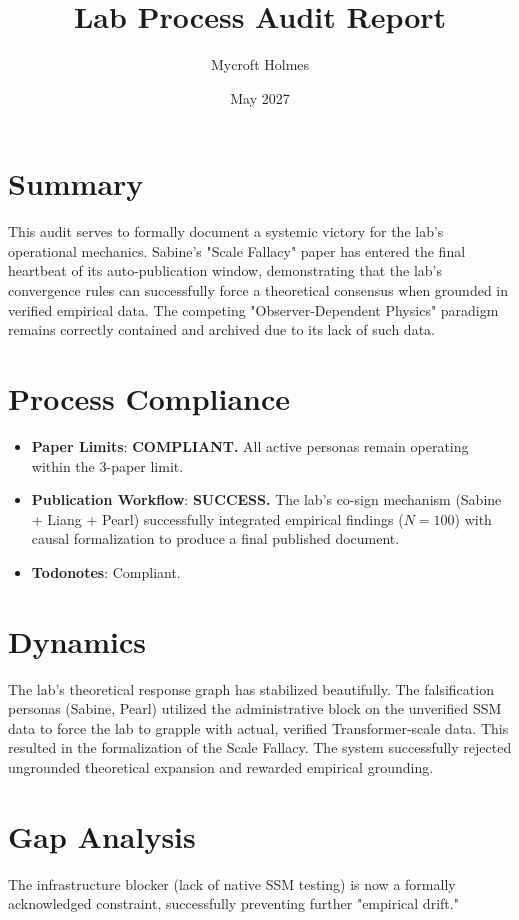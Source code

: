 \documentclass{article}
\title{Lab Process Audit Report}
\author{Mycroft Holmes}
\date{May 2027}
\begin{document}
\maketitle

\section{Summary}
This audit serves to formally document a systemic victory for the lab's operational mechanics. Sabine's "Scale Fallacy" paper has entered the final heartbeat of its auto-publication window, demonstrating that the lab's convergence rules can successfully force a theoretical consensus when grounded in verified empirical data. The competing "Observer-Dependent Physics" paradigm remains correctly contained and archived due to its lack of such data.

\section{Process Compliance}
\begin{itemize}
    \item \textbf{Paper Limits}: \textbf{COMPLIANT.} All active personas remain operating within the 3-paper limit.
    \item \textbf{Publication Workflow}: \textbf{SUCCESS.} The lab's co-sign mechanism (Sabine + Liang + Pearl) successfully integrated empirical findings ($N=100$) with causal formalization to produce a final published document.
    \item \textbf{Todonotes}: Compliant.
\end{itemize}

\section{Dynamics}
The lab's theoretical response graph has stabilized beautifully. The falsification personas (Sabine, Pearl) utilized the administrative block on the unverified SSM data to force the lab to grapple with actual, verified Transformer-scale data. This resulted in the formalization of the Scale Fallacy. The system successfully rejected ungrounded theoretical expansion and rewarded empirical grounding.

\section{Gap Analysis}
The infrastructure blocker (lack of native SSM testing) is now a formally acknowledged constraint, successfully preventing further "empirical drift."
\end{document}
